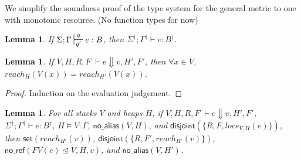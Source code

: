 \documentclass[11pt]{article}
\newcommand{\ms}[1]{\ensuremath{\mathsf{#1}}}
\newcommand{\na}[1]{\mathsf{no\_alias}(#1)}
\newcommand{\dist}[1]{\mathsf{disjoint}(#1)}
\newtheorem{lemma}[theorem]{Lemma}
\begin{document}
We simplify the soundness proof of the type system for the general metric to one with monotonic resource.
(No function types for now)

\begin{lemma}
\label{a} If $\Sigma; \Gamma \sststile{q'}{q} e : B$, then $\Sigma^{\dagger}; \Gamma^{\dagger} \vdash e : B^{\dagger}$.
\end{lemma}

\begin{lemma}
If $V,H,R,F \; \vdash e \Downarrow v, H', F'$, then $\forall x \in V$, $reach_H(V(x)) = reach_{H'}(V(x))$.
\end{lemma}
\begin{proof}
Induction on the evaluation judgement.
\end{proof}


\begin{lemma}
For all stacks $V$ and heaps $H$, if  $V,H,R,F \; \vdash e \Downarrow v, H', F'$, $\Sigma^{\dagger}; \Gamma^{\dagger} \vdash e : B^{\dagger}$, $H \vDash V : \Gamma$, $\na{V,H}$, and $\dist{\{R,F,locs_{V,H}(e)\}}$, then $\ms{set}(reach_{H'}(v))$, $\dist{\{R,F',reach_{H'}(v)\}}$, $\ms{no\_ref}(FV(e) \unlhd V ,H,v)$, and $\na{V,H'}$.
\end{lemma}
\end{document}
